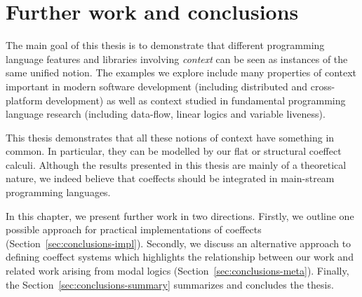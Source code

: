 
\chapter{Further work and conclusions} 
\label{ch:conclusions} 

The main goal of this thesis is to demonstrate that different programming language features
and libraries involving \emph{context} can be seen as instances of the same unified notion.
The examples we explore include many properties of context important in modern software 
development (including distributed and cross-platform development) as well as context studied 
in fundamental programming language research (including data-flow, linear logics and variable 
liveness).

This thesis demonstrates that all these notions of context have something in common. In 
particular, they can be modelled by our flat or structural coeffect calculi. Although the 
results presented in this thesis are mainly of a theoretical nature, we indeed believe that 
coeffects should be integrated in main-stream programming languages.

In this chapter, we present further work in two directions. Firstly, we outline one possible
approach for practical implementations of coeffects (Section~\ref{sec:conclusions-impl}). 
Secondly, we discuss an alternative approach to defining coeffect systems which highlights
the relationship between our work and related work arising from modal logics 
(Section~\ref{sec:conclusions-meta}). Finally, the Section~\ref{sec:conclusions-summary} summarizes
and concludes the thesis.



%                                                                   
%                                                                

